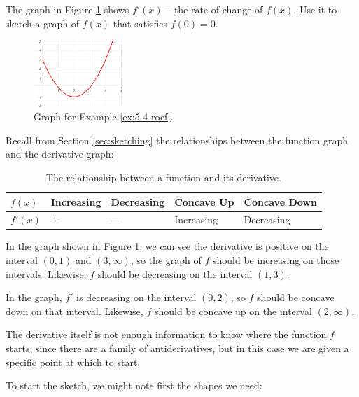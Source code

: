 \begin{example}
  \label{ex:5-4-rocf}
The graph in Figure \ref{fig:5-4-rocf} shows $f'(x)$ – the rate of change of $f(x)$. Use it to sketch a graph of $f(x)$ that satisfies $f(0)=0$.

\begin{figure}[!ht]
  \centering
    \includegraphics[width=0.3\textwidth]{img/chap5/image038.png}
    \caption{Graph for Example \ref{ex:5-4-rocf}.}
    \label{fig:5-4-rocf}
\end{figure}

\begin{solution}
Recall from Section \ref{sec:sketching} the relationships between the function graph and the derivative graph:
\begin{table}[ht!]
    \centering
    \begin{tabular}{*{5}{l}}
    \toprule
    $f(x)$ &	Increasing &	Decreasing &	Concave Up &	Concave Down	\\
    \midrule
    $f'(x)$	& $+$ & $-$ &	Increasing & Decreasing \\
    \bottomrule
    \end{tabular}
    \caption{The relationship between a function and its derivative.}
    \label{tab:5-derivs}
\end{table}

In the graph shown in Figure \ref{fig:5-4-rocf}, we can see the derivative is positive on the interval $(0, 1)$ and $(3,\infty)$, so the graph of $f$ should be increasing on those intervals. Likewise, $f$ should be decreasing on the interval $(1,3)$.

In the graph, $f'$ is decreasing on the interval $(0, 2)$, so $f$ should be concave down on that interval. Likewise, $f$ should be concave up on the interval $(2,\infty)$.

The derivative itself is not enough information to know where the function $f$ starts, since there are a family of antiderivatives, but in this case we are given a specific point at which to start.

To start the sketch, we might note first the shapes we need:


\end{solution}
\end{example}
